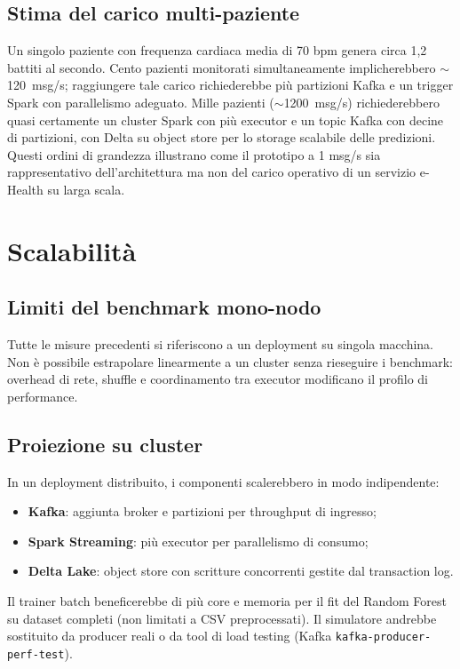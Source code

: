 \subsection{Stima del carico multi-paziente}

Un singolo paziente con frequenza cardiaca media di 70 bpm genera circa 1,2 battiti al secondo.
Cento pazienti monitorati simultaneamente implicherebbero $\sim$120~msg/s; raggiungere tale carico richiederebbe più partizioni Kafka e un trigger Spark con parallelismo adeguato.
Mille pazienti ($\sim$1200~msg/s) richiederebbero quasi certamente un cluster Spark con più executor e un topic Kafka con decine di partizioni, con Delta su object store per lo storage scalabile delle predizioni.
Questi ordini di grandezza illustrano come il prototipo a 1 msg/s sia rappresentativo dell'architettura ma non del carico operativo di un servizio e-Health su larga scala.

\section{Scalabilità}\label{sec:scalabilita}

\subsection{Limiti del benchmark mono-nodo}

Tutte le misure precedenti si riferiscono a un deployment su singola macchina.
Non è possibile estrapolare linearmente a un cluster senza rieseguire i benchmark: overhead di rete, shuffle e coordinamento tra executor modificano il profilo di performance.

\subsection{Proiezione su cluster}

In un deployment distribuito, i componenti scalerebbero in modo indipendente:
\begin{itemize}
  \item \textbf{Kafka}: aggiunta broker e partizioni per throughput di ingresso;
  \item \textbf{Spark Streaming}: più executor per parallelismo di consumo;
  \item \textbf{Delta Lake}: object store con scritture concorrenti gestite dal transaction log.
\end{itemize}

Il trainer batch beneficerebbe di più core e memoria per il fit del Random Forest su dataset completi (non limitati a CSV preprocessati).
Il simulatore andrebbe sostituito da producer reali o da tool di load testing (Kafka \texttt{kafka-producer-perf-test}).

